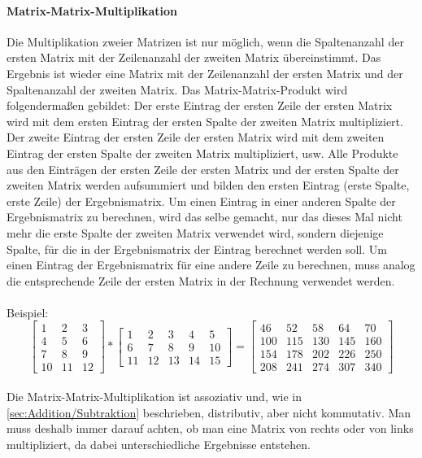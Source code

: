 \documentclass[11pt]{scrreprt}
\begin{document}
\paragraph{Matrix-Matrix-Multiplikation}
Die Multiplikation zweier Matrizen ist nur möglich, wenn die Spaltenanzahl der ersten Matrix mit der Zeilenanzahl der zweiten Matrix übereinstimmt. Das Ergebnis ist wieder eine Matrix mit der Zeilenanzahl der ersten Matrix und der Spaltenanzahl der zweiten Matrix. Das Matrix-Matrix-Produkt wird folgendermaßen gebildet: Der erste Eintrag der ersten Zeile der ersten Matrix wird mit dem ersten Eintrag der ersten Spalte der zweiten Matrix multipliziert. Der zweite Eintrag der ersten Zeile der ersten Matrix wird mit dem zweiten Eintrag der ersten Spalte der zweiten Matrix multipliziert, usw. Alle Produkte aus den Einträgen der ersten Zeile der ersten Matrix und der ersten Spalte der zweiten Matrix werden aufsummiert und bilden den ersten Eintrag (erste Spalte, erste Zeile) der Ergebnismatrix. Um einen Eintrag in einer anderen Spalte der Ergebnismatrix zu berechnen, wird das selbe gemacht, nur das dieses Mal nicht mehr die erste Spalte der zweiten Matrix verwendet wird, sondern diejenige Spalte, für die in der Ergebnismatrix der Eintrag berechnet werden soll. Um einen Eintrag der Ergebnismatrix für eine andere Zeile zu berechnen, muss analog die entsprechende Zeile der ersten Matrix in der Rechnung verwendet werden.\\
\\
Beispiel:
\begin{equation}
\begin{bmatrix}
1 & 2 & 3 \\
4 & 5 & 6 \\
7 & 8 & 9 \\
10 & 11 & 12
\end {bmatrix}
*
\begin{bmatrix}
1 &  2 & 3 & 4 & 5\\
6 &  7 & 8 & 9 & 10\\
11&12&13&14& 15 
\end {bmatrix}
=
\begin{bmatrix}
46 & 52 & 58 & 64 & 70  \\
100 & 115  & 130 & 145 & 160\\
154 & 178 & 202 & 226 & 250\\
208 & 241 & 274 & 307 & 340
\end {bmatrix}
\end{equation}
\\
Die Matrix-Matrix-Multiplikation ist assoziativ und, wie in \ref{sec:Addition/Subtraktion} beschrieben, distributiv, aber nicht kommutativ. Man muss deshalb immer darauf achten, ob man eine Matrix von rechts oder von links multipliziert, da dabei unterschiedliche Ergebnisse entstehen.
\end{document}
